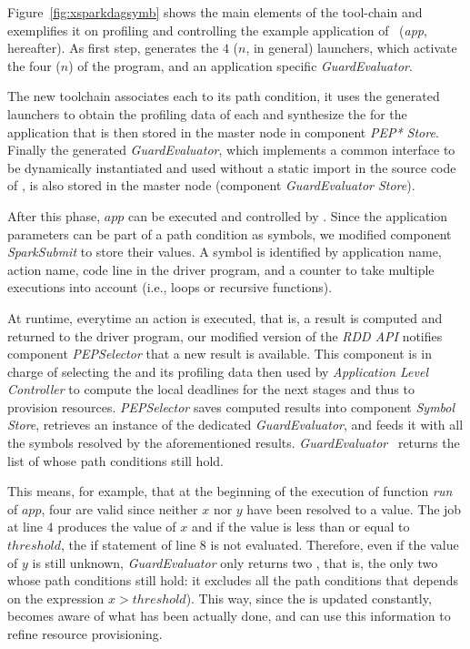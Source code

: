 Figure~\ref{fig:xsparkdagsymb} shows the main elements of the tool-chain and exemplifies it on profiling and controlling the example application of~ (\textit{app}, hereafter). As first step, \dSymb generates the $4$ ($n$, in general) launchers, which activate the four ($n$) \plans of the program, and an application specific \textit{GuardEvaluator}. 

The new toolchain associates each \plan to its path condition, it uses the generated launchers to obtain the profiling data of each \plan and synthesize the \model for the application that is then stored in the master node in component \textit{PEP* Store}. Finally the generated \textit{GuardEvaluator}, which implements a common interface to be dynamically instantiated and used without a static import in the source code of \cSpark, is also stored in the master node (component \textit{GuardEvaluator Store}).

After this phase, $app$ can be executed and controlled by \cSpark. 
Since the application parameters can be part of a path condition as symbols, we modified component \textit{SparkSubmit} to store their values. A symbol is identified by application name, action name, code line in the driver program, and a counter to take multiple executions into account  (i.e., loops or recursive functions). 

At runtime, everytime an action is executed, that is, a result is computed and returned to the driver program, our modified version of the  \textit{RDD API} notifies component \textit{PEPSelector} that a new result is available. This component is in charge of selecting the \plan and its profiling data then used by \textit{Application Level Controller} to compute the local deadlines for the next stages and thus to provision resources. \textit{PEPSelector} saves computed results into component \textit{Symbol Store}, retrieves an instance of the dedicated \textit{GuardEvaluator}, and feeds it with all the symbols resolved 
by the aforementioned results. \textit{GuardEvaluator}~\cite{Baresi-Quattrocchi-Denaro:2019} returns the list of \plan whose path conditions still hold.

This means, for example, that at the beginning of the execution of function \textit{run} of $app$, four \plans are valid since neither $x$ nor $y$ have been resolved to a value. The job at line $4$ produces the value of $x$ and if the value is less than or equal to $threshold$,  the if statement of line $8$ is not evaluated. Therefore, even if the value of $y$ is still unknown, \textit{GuardEvaluator} only returns two \plans, that is, the only two \plans whose path conditions still hold: it excludes all the path conditions that depends on the expression $x > threshold$). This way, since the \plan is updated constantly, \cSpark becomes aware of what has been actually done, and can use this information to refine resource provisioning.  

